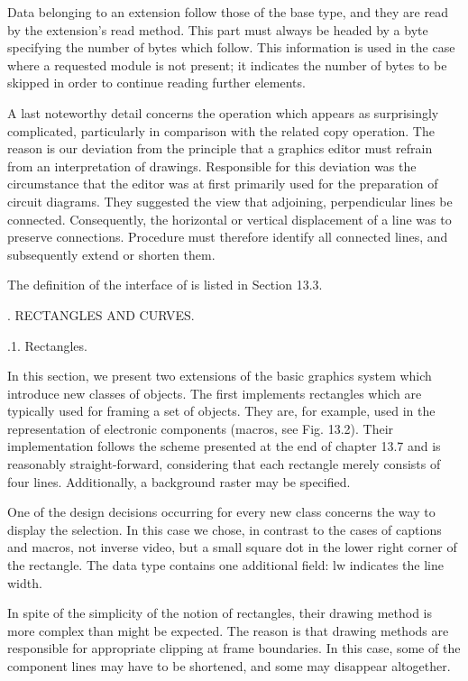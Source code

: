 Data belonging to an extension follow those of the base type, and they are read by the extension's read method. This part must always be headed by a byte specifying the number of bytes which follow. This information is used in the case where a requested module is not present; it indicates the number of bytes to be skipped in order to continue reading further elements.

A last noteworthy detail concerns the  operation which appears as surprisingly complicated, particularly in comparison with the related copy operation. The reason is our deviation from the principle that a graphics editor must refrain from an interpretation of drawings. Responsible for this deviation was the circumstance that the editor was at first primarily used for the preparation of circuit diagrams. They suggested the view that adjoining, perpendicular lines be connected. Consequently, the horizontal or vertical displacement of a line was to preserve connections. Procedure  must therefore identify all connected lines, and subsequently extend or shorten them.

The definition of the interface of  is listed in Section 13.3.

. RECTANGLES AND CURVES.

.1. Rectangles.

In this section, we present two extensions of the basic graphics system which introduce new classes of objects. The first implements rectangles which are typically used for framing a set of objects. They are, for example, used in the representation of electronic components (macros, see Fig. 13.2). Their implementation follows the scheme presented at the end of chapter 13.7 and is reasonably straight-forward, considering that each rectangle merely consists of four lines. Additionally, a background raster may be specified.

One of the design decisions occurring for every new class concerns the way to display the selection. In this case we chose, in contrast to the cases of captions and macros, not inverse video, but a small square dot in the lower right corner of the rectangle. The data type  contains one additional field: lw indicates the line width.

In spite of the simplicity of the notion of rectangles, their drawing method is more complex than might be expected. The reason is that drawing methods are responsible for appropriate clipping at frame boundaries. In this case, some of the component lines may have to be shortened, and some may disappear altogether.

